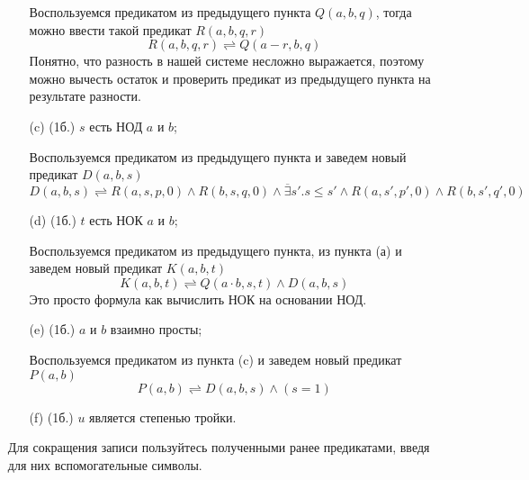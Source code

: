 \begin{enumerate}
\begin{itemize}
        \begin{solution}
            Воспользуемся предикатом из предыдущего пункта $Q(a,b,q)$, тогда можно ввести такой предикат $R(a,b,q,r)$
            \begin{equation}
                R(a,b,q,r) \rightleftharpoons Q(a - r,b,q)
            \end{equation}
            Понятно, что разность в нашей системе несложно выражается, поэтому можно вычесть остаток и проверить предикат из предыдущего пункта на результате разности.
        \end{solution}
        \item[(c)] (1б.) $s$ есть НОД $a$ и $b$;
        \begin{solution}
            Воспользуемся предикатом из предыдущего пункта и заведем новый предикат $D(a,b,s)$
            \begin{equation}
                D(a,b,s) \rightleftharpoons R(a,s,p,0) \land R(b,s,q,0) \land \overline{\exists} s'. s \leq s' \land R(a,s',p',0) \land R(b,s',q',0)
            \end{equation}
        \end{solution}
        \item[(d)] (1б.) $t$ есть НОК $a$ и $b$;
        \begin{solution}
            Воспользуемся предикатом из предыдущего пункта, из пункта (а) и заведем новый предикат $K(a,b,t)$
            \begin{equation}
                K(a,b,t) \rightleftharpoons Q(a \cdot b,s,t) \land D(a,b,s)
            \end{equation}
            Это просто формула как вычислить НОК на основании НОД.
        \end{solution}
        \item[(e)] (1б.) $a$ и $b$ взаимно просты;
        \begin{solution}
            Воспользуемся предикатом из пункта (c) и заведем новый предикат $P(a,b)$
            \begin{equation}
                P(a,b) \rightleftharpoons D(a,b,s) \land (s=1)
            \end{equation}
        \end{solution}
        \item[(f)] (1б.) $u$ является степенью тройки.
    \end{itemize}
    Для сокращения записи пользуйтесь полученными ранее предикатами, введя для них вспомогательные символы.
    
\end{enumerate}
\clearpage
